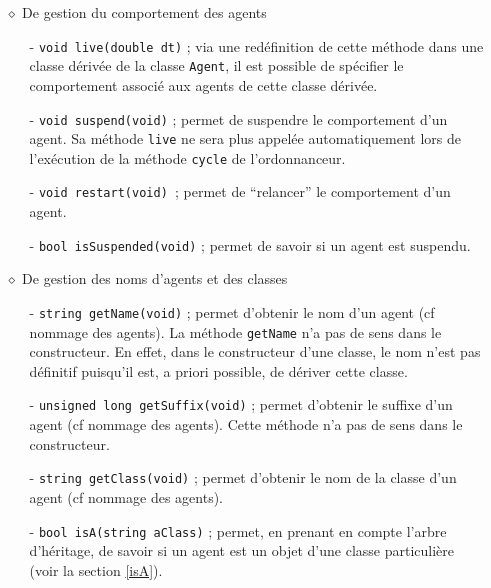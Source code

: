 \documentclass[12pt]{article}
\begin{document}
\begin{itemize}
\vspace{-0.2cm}
\item[$\diamond$] De gestion du comportement des agents
\begin{itemize}
\vspace{-0.1cm}
\item[-] {\tt void live(double dt)} ; via une red\'efinition de cette
m\'ethode dans une classe d\'eriv\'ee de la classe {\tt Agent}, il est
possible de sp\'ecifier le comportement associ\'e aux agents de cette
classe d\'eriv\'ee.
\vspace{-0.1cm}
\item[-] {\tt void suspend(void)} ; permet de suspendre le comportement d'un
agent. Sa m\'ethode {\tt live} ne sera plus appel\'ee automatiquement lors
de l'ex\'ecution de la m\'ethode {\tt cycle} de
l'ordonnanceur.
\vspace{-0.1cm}
\item[-] {\tt void restart(void) }; permet de ``relancer'' le comportement
d'un agent.
\vspace{-0.1cm}
\item[-] {\tt bool isSuspended(void)} ; permet de savoir si un agent est
suspendu.
\end{itemize}

\vspace{-0.4cm}
\item[$\diamond$] De gestion des noms d'agents et des classes

\begin{itemize}
\vspace{-0.2cm}
\item[-] {\tt string getName(void)} ; permet d'obtenir le nom d'un agent
(cf nommage des agents). La m\'ethode {\tt getName} n'a pas de sens
dans le constructeur. En effet, dans le constructeur d'une classe,
le nom n'est pas d\'efinitif puisqu'il est, a priori possible, 
de d\'eriver cette classe.
\vspace{-0.1cm}
\item[-] {\tt unsigned long getSuffix(void)} ; permet d'obtenir le suffixe
d'un agent (cf nommage des agents).
Cette m\'ethode n'a pas de sens dans le constructeur.
\vspace{-0.1cm}
\item[-] {\tt string getClass(void)} ; permet d'obtenir le nom de la
classe d'un agent (cf nommage des agents).
\vspace{-0.1cm}
\item[-] {\tt bool isA(string aClass)} ; permet, en prenant en compte
l'arbre d'h\'eritage, de savoir si un agent est un objet d'une classe
particuli\`ere (voir la section \ref{isA}).
\end{itemize}


\end{itemize}
\end{document}
